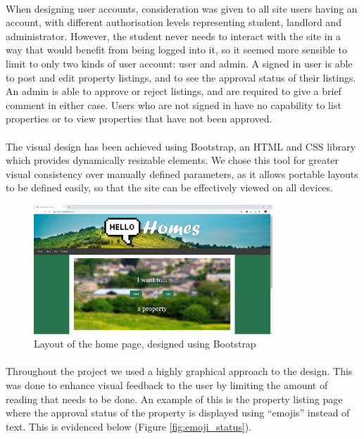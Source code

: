 \documentclass{article}
\begin{document}
    \paragraph{}
        When designing user accounts, consideration was given to all site users having an account, with different authorisation levels representing student, landlord and administrator.
        However, the student never needs to interact with the site in a way that would benefit from being logged into it, so it seemed more sensible to limit to only two kinds of user account: user and admin.
        A signed in user is able to post and edit property listings, and to see the approval status of their listings.
        An admin is able to approve or reject listings, and are required to give a brief comment in either case.
        Users who are not signed in have no capability to list properties or to view properties that have not been approved.

    \paragraph{}
        The visual design has been achieved using Bootstrap, an HTML and CSS library which provides dynamically resizable elements.
        We chose this tool for greater visual consistency over manually defined parameters, as it allows portable layouts to be defined easily, so that the site can be effectively viewed on all devices.

        \begin{figure}[!htb]
            \centering
            \includegraphics[width=0.8\textwidth]{figures/index_page.png}
            \caption[Home page layout]{Layout of the home page, designed using Bootstrap}
            \label{fig:index_page}
        \end{figure}

    \paragraph{}
        Throughout the project we used a highly graphical approach to the design. This was done to enhance visual feedback to the user by limiting the amount of reading that needs to be done. An example of this is the property listing page where the approval status of the property is displayed using “emojis” instead of text. This is evidenced below (Figure \ref{fig:emoji_status}).
\end{document}
